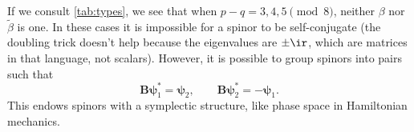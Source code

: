 \documentclass[11pt]{article}
\renewcommand{\S}{\mathbf{S}}
\newcommand{\B}{\mathbf{B}}
\newcommand{\Bt}{\widetilde{\B}}
\newcommand{\psib}{\boldsymbol{\psi}}
\newcommand{\Omegab}{\boldsymbol{\Omega}}
\newcommand{\betat}{\tilde{\beta}}
\begin{document}
If we consult \cref{tab:types}, we see that when \( p-q = 3,4,5 \pmod 8 \), neither $\beta$ nor $\betat$ is one.
In these cases it is impossible for a spinor to be self-conjugate
(the doubling trick doesn't help because the eigenvalues are $\pm\ir$, which are matrices in that language, not scalars).
However, it is possible to group spinors into pairs such that
%
\begin{equation}\label{eq:pseudomajorana}
  \B \psib_1^\ast = \psib_2,
  \qquad
  \B \psib_2^\ast = -\psib_1.
\end{equation}
%
This endows spinors with a symplectic structure, like phase space in Hamiltonian mechanics.
\end{document}
